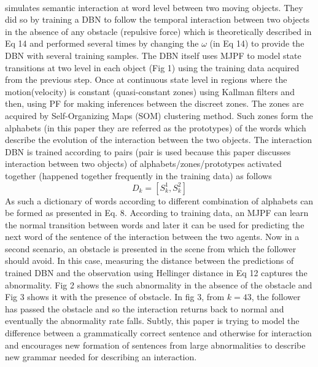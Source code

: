 \documentclass{article}
\begin{document}
				\paragraph{\cite{baydoun-2019-prediction-of-multi-target-dynamics-using-discrete-descriptors-an-interactive-approach}} simulates semantic interaction at word level between two moving objects. They did so by training a DBN to follow the temporal interaction between two objects in the absence of any obstacle (repulsive force) which is theoretically described in Eq 14 and performed several times by changing the $\omega$ (in Eq 14) to provide the DBN with several training samples. The DBN itself uses MJPF to model state transitions at two level in each object (Fig 1) using the training data acquired from  the previous step. Once at continuous state level in regions where the motion(velocity) is constant (quasi-constant zones) using Kallman filters and then, using PF for making inferences between the discreet zones. The zones are acquired by Self-Organizing Maps (SOM) clustering method. Such zones form the alphabets (in this paper they are referred as the prototypes) of the words which describe the evolution of the interaction between the two objects. The interaction DBN is trained according to pairs (pair is used because this paper discusses interaction between two objects) of alphabets/zones/prototypes activated together (happened together frequently in the training data) as follows
				\begin{equation}
					D_k = [S_k^{1},S_k^{2}]
				\end{equation}	
				As such a dictionary of words according to different combination of alphabets can be formed as presented in Eq. 8. 
				According to training data, an MJPF can learn the normal transition between words and later it can be used for predicting the next word of the sentence of the interaction between the two agents. Now in a second scenario, an obstacle is presented in the scene from which the follower should avoid. In this case, measuring the distance between the predictions of trained DBN and the observation using Hellinger distance in Eq 12 captures the abnormality. Fig 2 shows the such abnormality in the absence of the obstacle and Fig 3 shows it with the presence of obstacle. In fig 3, from $k=43$, the follower has passed the obstacle and so the interaction returns back to normal and eventually the abnormality rate falls. Subtly, this paper is trying to model the difference between a grammatically correct sentence and otherwise for interaction and encourages new formation of sentences from large abnormalities to describe new grammar needed for describing an interaction.  
\end{document}
